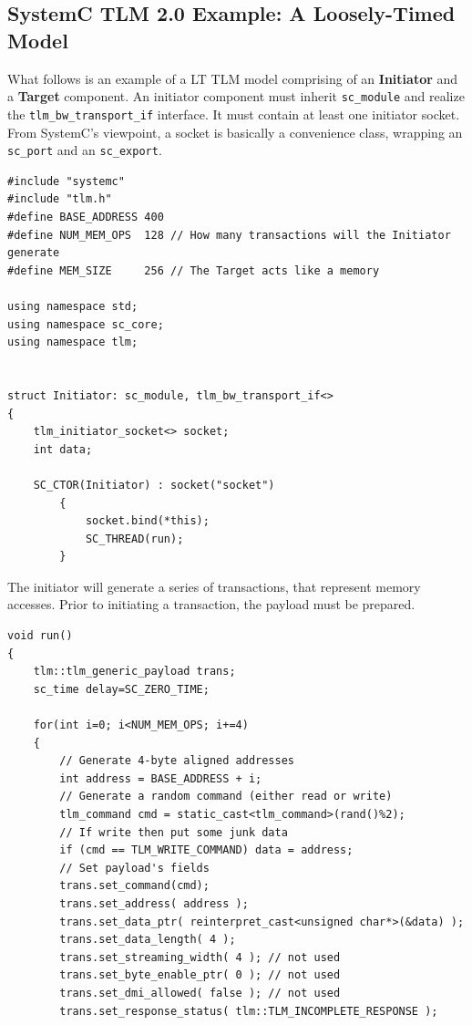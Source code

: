 \documentclass[11pt]{article}
\begin{document}
\subsection{SystemC TLM 2.0 Example: A Loosely-Timed Model}
\label{AppendixE}
What follows is an example of a LT TLM model comprising of an \textbf{Initiator} and a \textbf{Target} component.
An initiator component must inherit \texttt{sc\_module} and realize the \texttt{tlm\_bw\_transport\_if} interface.
It must contain at least one initiator socket.
From SystemC's viewpoint, a socket is basically a convenience class, wrapping an \texttt{ sc\_port} and an \texttt{sc\_export}.
\begin{verbatim}
#include "systemc"
#include "tlm.h"
#define BASE_ADDRESS 400
#define NUM_MEM_OPS  128 // How many transactions will the Initiator generate
#define MEM_SIZE     256 // The Target acts like a memory

using namespace std;
using namespace sc_core;
using namespace tlm;


struct Initiator: sc_module, tlm_bw_transport_if<>
{
    tlm_initiator_socket<> socket; 
    int data;

    SC_CTOR(Initiator) : socket("socket")
        {
            socket.bind(*this);
            SC_THREAD(run);
        }
\end{verbatim}
The initiator will generate a series of transactions, that represent memory accesses.
Prior to initiating a transaction, the payload must be prepared.
\begin{verbatim}
void run()
{
    tlm::tlm_generic_payload trans;
    sc_time delay=SC_ZERO_TIME;

    for(int i=0; i<NUM_MEM_OPS; i+=4)
    {
        // Generate 4-byte aligned addresses
        int address = BASE_ADDRESS + i;
        // Generate a random command (either read or write)
        tlm_command cmd = static_cast<tlm_command>(rand()%2);
        // If write then put some junk data
        if (cmd == TLM_WRITE_COMMAND) data = address;
        // Set payload's fields
        trans.set_command(cmd);
        trans.set_address( address );
        trans.set_data_ptr( reinterpret_cast<unsigned char*>(&data) );
        trans.set_data_length( 4 );
        trans.set_streaming_width( 4 ); // not used
        trans.set_byte_enable_ptr( 0 ); // not used
        trans.set_dmi_allowed( false ); // not used
        trans.set_response_status( tlm::TLM_INCOMPLETE_RESPONSE );
\end{verbatim}
\end{document}
